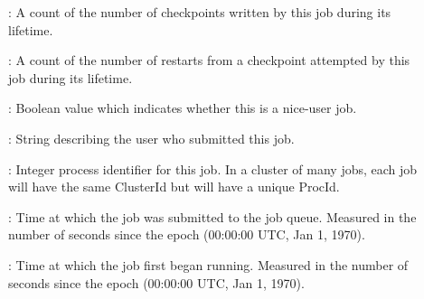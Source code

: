 \begin{description}
\item[] : A count of the number of checkpoints
written by this job during its lifetime.
%
\item[] : A count of the number of restarts from a
checkpoint attempted by this job during its lifetime.
%
\item[] : Boolean value which indicates whether
this is a nice-user job.
%
\item[] : String describing the user who submitted this
job.
%
\item[] : Integer process identifier for this job.  In
a cluster of many jobs, each job will have the same ClusterId but will
have a unique ProcId.
%
\item[] : Time at which the job was submitted to the job
queue.  Measured in the
number of seconds since the epoch (00:00:00 UTC, Jan 1, 1970).
%
\item[] : Time at which the job first began
running.  Measured in the
number of seconds since the epoch (00:00:00 UTC, Jan 1, 1970).
%
\end{description}
